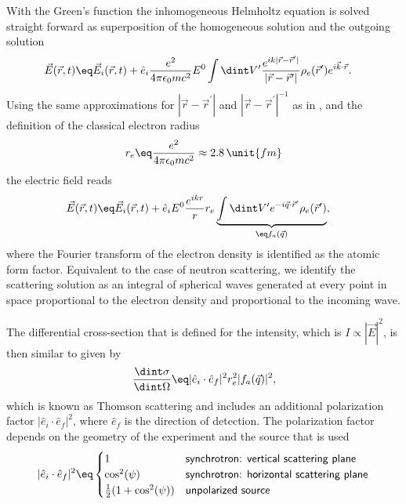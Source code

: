 \documentclass[\main/dresen_thesis.tex]{subfiles}
\begin{document}
With the Green's function the inhomogeneous Helmholtz equation is solved straight forward as superposition of the homogeneous solution and the outgoing solution
\begin{align}
  \vec{E} (\vec{r}, t) \eq& \vec{E}_i(\vec{r}, t) + \hat{e}_i \frac{e^2}{4\pi \epsilon_0 m c^2} E^0 \int \dint V^\prime \frac{e^{i k |\vec{r} - \vec{r}^\prime|}}{|\vec{r} - \vec{r}^\prime|} \rho_e (\vec{r}^\prime) e^{i\vec{k}\cdot \vec{r}}.
\end{align}
Using the same approximations for $|\vec{r} - \vec{r}^\prime|$ and $|\vec{r} - \vec{r}^\prime|^{-1}$ as in , and the definition of the classical electron radius
\begin{align}
  r_e \eq \frac{e^2}{4\pi \epsilon_0 m c^2} \approx 2.8 \, \unit{fm}
\end{align}
the electric field reads
\begin{align}
  \vec{E} (\vec{r}, t) \eq& \vec{E}_i(\vec{r}, t) + \hat{e}_i E^0   \frac{e^{ik r}}{r} r_e \underbrace{\int \dint V^\prime e^{-i \vec{q} \cdot  \vec{r}^\prime}  \rho_e (\vec{r}^\prime)}_{\eq f_a(\vec{q})},
\end{align}
where the Fourier transform of the electron density is identified as the atomic form factor.
Equivalent to the case of neutron scattering, we identify the scattering solution as an integral of spherical waves generated at every point in space proportional to the electron density and proportional to the incoming wave.

The differential cross-section that is defined for the intensity, which is $I \propto |\vec{E}|^2$, is then similar to  given by
\begin{align}
  \frac{\dint \sigma}{\dint \Omega} \eq |\hat{e}_i \cdot \hat{e}_f|^2 r_e^2 |f_a(\vec{q})|^2,
\end{align}
which is known as Thomson scattering and includes an additional polarization factor $|\hat{e}_i \cdot \hat{e}_f|^2$, where $\hat{e}_f$ is the direction of detection.
The polarization factor depends on the geometry of the experiment and the source that is used \cite{AlsNielsen_2011_Eleme}
\begin{align}
  |\hat{e}_i \cdot \hat{e}_f|^2 \eq \begin{cases}
    1 & \textsf{synchrotron: vertical scattering plane} \\
    \cos^2(\psi) & \textsf{synchrotron: horizontal scattering plane}\\
    \frac{1}{2} (1+\cos^2(\psi)) & \textsf{unpolarized source}
  \end{cases}
\end{align}
\end{document}
